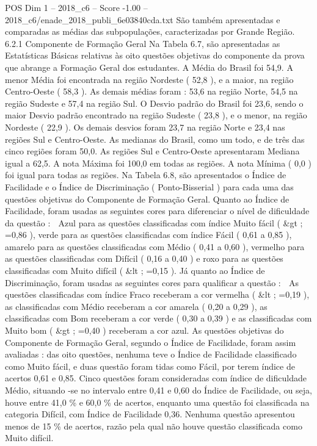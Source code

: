 \begin{textsample}{POS Dim 1 – 2018\_c6 – Score -1.00 – 2018\_c6/enade\_2018\_publi\_6e03840cda.txt}
São também apresentadas e comparadas as médias das subpopulações, caracterizadas por Grande Região. 6.2.1 Componente de Formação Geral Na Tabela 6.7, são apresentadas as Estatísticas Básicas relativas às oito questões objetivas do componente da prova que abrange a Formação Geral dos estudantes.
A Média do Brasil foi 54,9.
A menor Média foi encontrada na região Nordeste ( 52,8 ), e a maior, na região Centro-Oeste ( 58,3 ).
As demais médias foram : 53,6 na região Norte, 54,5 na região Sudeste e 57,4 na região Sul.
O Desvio padrão do Brasil foi 23,6, sendo o maior Desvio padrão encontrado na região Sudeste ( 23,8 ), e o menor, na região Nordeste ( 22,9 ).
Os demais desvios foram 23,7 na região Norte e 23,4 nas regiões Sul e Centro-Oeste.
As medianas do Brasil, como um todo, e de três das cinco regiões foram 50,0.
As regiões Sul e Centro-Oeste apresentaram Mediana igual a 62,5.
A nota Máxima foi 100,0 em todas as regiões.
A nota Mínima ( 0,0 ) foi igual para todas as regiões.
Na Tabela 6.8, são apresentados o Índice de Facilidade e o Índice de Discriminação ( Ponto-Bisserial ) para cada uma das questões objetivas do Componente de Formação Geral.
Quanto ao Índice de Facilidade, foram usadas as seguintes cores para diferenciar o nível de dificuldade da questão :  Azul para as questões classificadas com índice Muito fácil ( \&gt ; =0,86 ), verde para as questões classificadas com índice Fácil ( 0,61 a 0,85 ), amarelo para as questões classificadas com Médio ( 0,41 a 0,60 ), vermelho para as questões classificadas com Difícil ( 0,16 a 0,40 ) e roxo para as questões classificadas com Muito difícil ( \&lt ; =0,15 ).
Já quanto ao Índice de Discriminação, foram usadas as seguintes cores para qualificar a questão :  As questões classificadas com índice Fraco receberam a cor vermelha ( \&lt ; =0,19 ), as classificadas com Médio receberam a cor amarela ( 0,20 a 0,29 ), as classificadas com Bom receberam a cor verde ( 0,30 a 0,39 ) e as classificadas com Muito bom ( \&gt ; =0,40 ) receberam a cor azul.
As questões objetivas do Componente de Formação Geral, segundo o Índice de Facilidade, foram assim avaliadas : das oito questões, nenhuma teve o Índice de Facilidade classificado como Muito fácil, e duas questão foram tidas como Fácil, por terem índice de acertos 0,61 e 0,85.
Cinco questões foram consideradas com índice de dificuldade Médio, situando -se no intervalo entre 0,41 e 0,60 do Índice de Facilidade, ou seja, houve entre 41,0 \% e 60,0 \% de acertos, enquanto uma questão foi classificada na categoria Difícil, com Índice de Facilidade 0,36.
Nenhuma questão apresentou menos de 15 \% de acertos, razão pela qual não houve questão classificada como Muito difícil.

\end{textsample}
